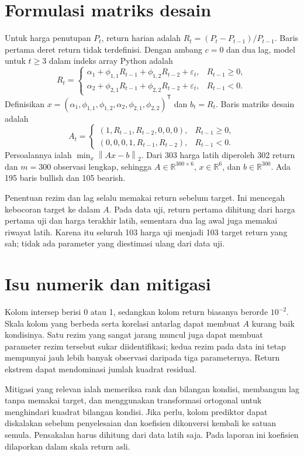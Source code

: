 \documentclass[12pt,a4paper]{article}
\numberwithin{equation}{section}
\newcommand{\R}{\mathbb{R}}
\newcommand{\norm}[1]{\left\lVert #1\right\rVert_2}
\begin{document}
\section{Formulasi matriks desain}
Untuk harga penutupan $P_t$, return harian adalah $R_t=(P_t-P_{t-1})/P_{t-1}$. Baris pertama deret return tidak terdefinisi. Dengan ambang $c=0$ dan dua lag, model untuk $t\geq3$ dalam indeks array Python adalah
\begin{equation}
R_t=\begin{cases}
\alpha_1+\phi_{1,1}R_{t-1}+\phi_{1,2}R_{t-2}+\varepsilon_t,& R_{t-1}\geq0,\\
\alpha_2+\phi_{2,1}R_{t-1}+\phi_{2,2}R_{t-2}+\varepsilon_t,& R_{t-1}<0.
\end{cases}
\end{equation}
Definisikan $x=(\alpha_1,\phi_{1,1},\phi_{1,2},\alpha_2,\phi_{2,1},\phi_{2,2})^\mathsf{T}$ dan $b_t=R_t$. Baris matriks desain adalah
\[
A_t=\begin{cases}
(1,R_{t-1},R_{t-2},0,0,0),&R_{t-1}\geq0,\\
(0,0,0,1,R_{t-1},R_{t-2}),&R_{t-1}<0.
\end{cases}
\]
Persoalannya ialah $\min_x\norm{Ax-b}$. Dari 303 harga latih diperoleh 302 return dan $m=300$ observasi lengkap, sehingga $A\in\R^{300\times6}$, $x\in\R^6$, dan $b\in\R^{300}$. Ada 195 baris bullish dan 105 bearish.

Penentuan rezim dan lag selalu memakai return sebelum target. Ini mencegah kebocoran target ke dalam $A$. Pada data uji, return pertama dihitung dari harga pertama uji dan harga terakhir latih, sementara dua lag awal juga memakai riwayat latih. Karena itu seluruh 103 harga uji menjadi 103 target return yang sah; tidak ada parameter yang diestimasi ulang dari data uji.

\section{Isu numerik dan mitigasi}
Kolom intersep berisi 0 atau 1, sedangkan kolom return biasanya berorde $10^{-2}$. Skala kolom yang berbeda serta korelasi antarlag dapat membuat $A$ kurang baik kondisinya. Satu rezim yang sangat jarang muncul juga dapat membuat parameter rezim tersebut sukar diidentifikasi; kedua rezim pada data ini tetap mempunyai jauh lebih banyak observasi daripada tiga parameternya. Return ekstrem dapat mendominasi jumlah kuadrat residual.

Mitigasi yang relevan ialah memeriksa rank dan bilangan kondisi, membangun lag tanpa memakai target, dan menggunakan transformasi ortogonal untuk menghindari kuadrat bilangan kondisi. Jika perlu, kolom prediktor dapat diskalakan sebelum penyelesaian dan koefisien dikonversi kembali ke satuan semula. Pensakalan harus dihitung dari data latih saja. Pada laporan ini koefisien dilaporkan dalam skala return asli.
\end{document}
